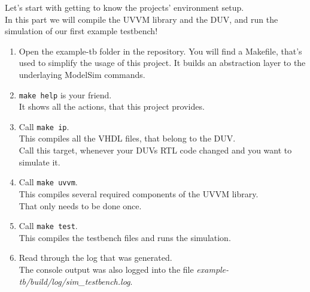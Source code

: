 Let's start with getting to know the projects' environment setup. \\
In this part we will compile the UVVM library and the DUV, and run the simulation of our first example testbench!

\begin{enumerate}
      \item Open the example-tb folder in the repository.
            You will find a Makefile, that's used to simplify the usage of this project. It builds an abstraction layer to the underlaying ModelSim commands.
      \item \texttt{make help} is your friend. \\
            It shows all the actions, that this project provides.
      \item Call \texttt{make ip}. \\
            This compiles all the VHDL files, that belong to the DUV.\\
            Call this target, whenever your DUVs RTL code changed and you want to simulate it.
      \item Call \texttt{make uvvm}. \\
            This compiles several required components of the UVVM library. \\
            That only needs to be done once.
      \item Call \texttt{make test}. \\
            This compiles the testbench files and runs the simulation.
      \item Read through the log that was generated.\\
            The console output was also logged into the file \textit{example-tb/build/log/sim\_testbench.log}.
\end{enumerate}

\subsubsection{}
